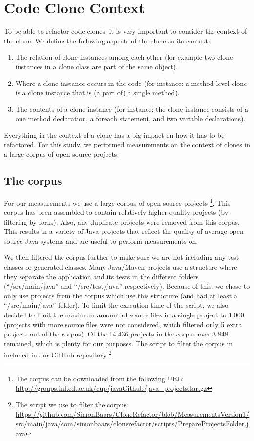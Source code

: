 \documentclass[a4paper]{article}
\begin{document}
\section{Code Clone Context}
To be able to refactor code clones, it is very important to consider the context of the clone. We define the following aspects of the clone as its context:
\begin{enumerate}
  \item The relation of clone instances among each other (for example two clone instances in a clone class are part of the same object).
  \item Where a clone instance occurs in the code (for instance: a method-level clone is a clone instance that is (a part of) a single method).
  \item The contents of a clone instance (for instance: the clone instance consists of a one method declaration, a foreach statement, and two variable declarations).
\end{enumerate}
Everything in the context of a clone has a big impact on how it has to be refactored. For this study, we performed measurements on the context of clones in a large corpus of open source projects.

\subsection{The corpus}
For our measurements we use a large corpus of open source projects \cite{githubCorpus2013}\footnote{The corpus can be downloaded from the following URL: \url{http://groups.inf.ed.ac.uk/cup/javaGithub/java_projects.tar.gz}}. This corpus has been assembled to contain relatively higher quality projects (by filtering by forks). Also, any duplicate projects were removed from this corpus. This results in a variety of Java projects that reflect the quality of average open source Java systems and are useful to perform measurements on.

We then filtered the corpus further to make sure we are not including any test classes or generated classes. Many Java/Maven projects use a structure where they separate the application and its tests in the different folders (``/src/main/java'' and ``/src/test/java'' respectively). Because of this, we chose to only use projects from the corpus which use this structure (and had at least a ``/src/main/java'' folder). To limit the execution time of the script, we also decided to limit the maximum amount of source files in a single project to 1.000 (projects with more source files were not considered, which filtered only 5 extra projects out of the corpus). Of the 14.436 projects in the corpus over 3.848 remained, which is plenty for our purposes. The script to filter the corpus in included in our GitHub repository \footnote{The script we use to filter the corpus: \url{https://github.com/SimonBaars/CloneRefactor/blob/MeasurementsVersion1/src/main/java/com/simonbaars/clonerefactor/scripts/PrepareProjectsFolder.java}}.
\end{document}
